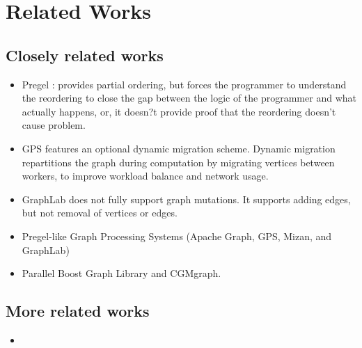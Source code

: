 \section{Related Works}
\subsection{Closely related works}
\begin{frame}
\begin{itemize}
  \item Pregel : provides partial ordering, but forces the programmer to understand the reordering to close the gap between the logic of the programmer and what actually happens, or, it doesn?t provide proof that the reordering doesn't cause problem.
  \item GPS features an optional dynamic migration scheme. Dynamic migration repartitions the graph during computation by migrating vertices between workers, to improve workload balance and network usage. 
  \item GraphLab does not fully support graph mutations. It supports adding edges, but not removal of vertices or edges.
  \item Pregel-like Graph Processing Systems (Apache Graph, GPS, Mizan, and GraphLab) 
  \item Parallel Boost Graph Library and CGMgraph. 
  \end{itemize}
\end{frame}

\subsection{More related works}
\begin{frame}
\begin{itemize}
  \item 
  \end{itemize}
\end{frame}